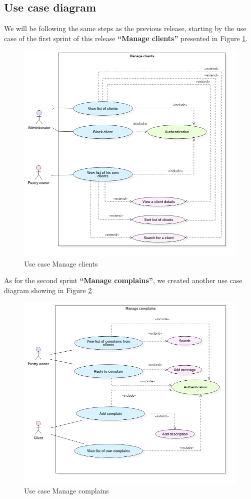 \documentclass[12pt,a4paper]{report}
\begin{document}
	\subsection{Use case diagram}
	We will be following the same steps as the previous release, starting by the use case of the first sprint of this release \textbf{``Manage clients''} presented in Figure \ref{clients-diag}.
	\begin{figure}[H]
		\vspace*{1cm}
		\centering
		\includegraphics[width=7.2in,keepaspectratio]{manageClients.png}
		\caption{Use case Manage clients}
		\label{clients-diag}
	\end{figure}
As for the second sprint \textbf{``Manage complains''}, we created another use case diagram showing in Figure \ref{complains-diag}
\begin{figure}[H]
	\vspace*{2cm}
	\centering
	\includegraphics[width=7in,keepaspectratio]{manageComplains.png}
	\caption{Use case Manage complains}
	\label{complains-diag}
\end{figure}
\end{document}
